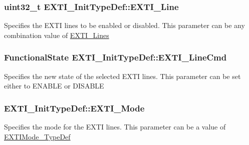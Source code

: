 \subsubsection[{E\+X\+T\+I\+\_\+\+Line}]{\setlength{\rightskip}{0pt plus 5cm}uint32\+\_\+t E\+X\+T\+I\+\_\+\+Init\+Type\+Def\+::\+E\+X\+T\+I\+\_\+\+Line}\label{struct_e_x_t_i___init_type_def_a1b5bb38e1df331f764b830a1e8ec171f}
Specifies the E\+X\+T\+I lines to be enabled or disabled. This parameter can be any combination value of \hyperlink{group___e_x_t_i___lines}{E\+X\+T\+I\+\_\+\+Lines} \hypertarget{struct_e_x_t_i___init_type_def_ac1769bc5badaef4cffbcf105e3fe1c27}{}
\subsubsection[{E\+X\+T\+I\+\_\+\+Line\+Cmd}]{\setlength{\rightskip}{0pt plus 5cm}Functional\+State E\+X\+T\+I\+\_\+\+Init\+Type\+Def\+::\+E\+X\+T\+I\+\_\+\+Line\+Cmd}\label{struct_e_x_t_i___init_type_def_ac1769bc5badaef4cffbcf105e3fe1c27}
Specifies the new state of the selected E\+X\+T\+I lines. This parameter can be set either to E\+N\+A\+B\+L\+E or D\+I\+S\+A\+B\+L\+E \hypertarget{struct_e_x_t_i___init_type_def_a741816862b9cd43cc80781dc89150e7e}{}
\subsubsection[{E\+X\+T\+I\+\_\+\+Mode}]{ E\+X\+T\+I\+\_\+\+Init\+Type\+Def\+::\+E\+X\+T\+I\+\_\+\+Mode}\label{struct_e_x_t_i___init_type_def_a741816862b9cd43cc80781dc89150e7e}
Specifies the mode for the E\+X\+T\+I lines. This parameter can be a value of \hyperlink{group___e_x_t_i_gad5e69af98dc0dfdf64417adc1cf57929}{E\+X\+T\+I\+Mode\+\_\+\+Type\+Def} \hypertarget{struct_e_x_t_i___init_type_def_ab0bd8417e78fe2b43eed79e44064510c}{}

